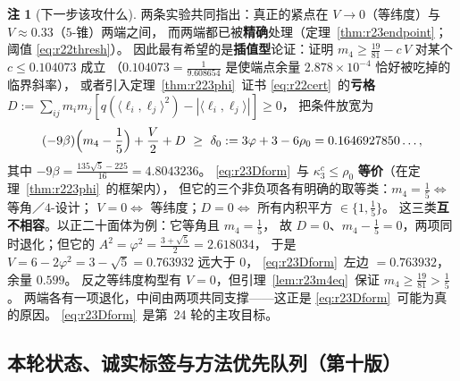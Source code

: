 \documentclass[UTF8,11pt]{ctexart}
\theoremstyle{definition}
\newtheorem{remark}[theorem]{注}
\begin{document}
\begin{remark}[下一步该攻什么]\label{rem:r23next}
两条实验共同指出：真正的紧点在 $V\to0$（等纬度）与 $V\approx0.33$（$5$-锥）两端之间，
而两端都已被\textbf{精确}处理（定理~\ref{thm:r23endpoint}；阈值 \eqref{eq:r22thresh}）。
因此最有希望的是\textbf{插值型}论证：证明
$m_4\ge\frac{19}{81}-c\,V$ 对某个 $c\le0.104073$ 成立
（$0.104073=\frac1{9.608654}$ 是使端点余量 $2.878\times10^{-4}$ 恰好被吃掉的临界斜率），
或者引入定理~\ref{thm:r223phi}~证书 \eqref{eq:r22cert}~的\textbf{亏格}
$D:=\sum_{ij}m_im_j[q(\langle\ell_i,\ell_j\rangle^2)-|\langle\ell_i,\ell_j\rangle|]\ge0$，
把条件放宽为
\begin{equation}\label{eq:r23Dform}
(-9\beta)\Bigl(m_4-\frac15\Bigr)+\frac V2+D\ \ge\ \delta_0:=3\varphi+3-6\rho_0=0.1646927850\ldots ,
\end{equation}
其中 $-9\beta=\frac{135\sqrt5-225}{16}=4.8043236$。
\eqref{eq:r23Dform}~与 $\kappa_3^c\le\rho_0$ \textbf{等价}（在定理~\ref{thm:r223phi}~的框架内），
但它的三个非负项各有明确的取等类：$m_4=\frac15\iff$ 等角／$4$-设计；
$V=0\iff$ 等纬度；$D=0\iff$ 所有内积平方 $\in\{1,\frac15\}$。
这三类\textbf{互不相容}。以正二十面体为例：它等角且 $m_4=\frac15$，
故 $D=0$、$m_4-\frac15=0$，两项同时退化；但它的 $A^2=\varphi^2=\frac{3+\sqrt5}2=2.618034$，
于是 $V=6-2\varphi^2=3-\sqrt5=0.763932$ 远大于 $0$，
\eqref{eq:r23Dform}~左边 $=0.763932$，余量 $0.599$。
反之等纬度构型有 $V=0$，但引理~\ref{lem:r23m4eq}~保证 $m_4\ge\frac{19}{81}>\frac15$。
两端各有一项退化，中间由两项共同支撑——这正是 \eqref{eq:r23Dform}~可能为真的原因。
\eqref{eq:r23Dform}~是第~24 轮的主攻目标。
\end{remark}

\subsection{本轮状态、诚实标签与方法优先队列（第十版）}\label{sec:r23:status}
\end{document}
